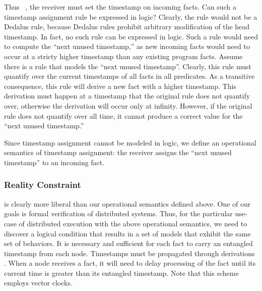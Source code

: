 Thus~ , the receiver must set the timestamp on incoming  facts.  Can such a timestamp assignment rule be expressed in logic?  Clearly, the rule would not be a Dedalus rule, because Dedalus rules prohibit arbitrary modification of the head timestamp.  In fact, no such rule can be expressed in logic.  Such a rule would need to compute the ``next unused timestamp,''  as new incoming facts would need to occur at a stricty higher timestamp than any existing program facts.  Assume there is a rule that models the ``next unused timestamp''.  Clearly, this rule must quantify over the current timestamps of all facts in all predicates.  As a transitive consequence, this rule will derive a new fact with a higher timestamp.  This derivation must happen at a timestamp that the original rule does not quantify over, otherwise the derivation will occur only at infinity.  However, if the original rule does not quantify over all time, it cannot produce a correct value for the ``next unused timestamp.'' 

Since timestamp assignment cannot be modeled in logic, we define an operational semantics of timestamp assignment:   the receiver assigns the ``next unused timestamp'' to an incoming fact.~

\subsubsection{Reality Constraint}

 is clearly more liberal than our operational semantics defined above.  One of our goals is formal verification of distributed systems.  Thus, for the particular use-case of distributed execution with the above operational semantics, we need to discover a logical condition that results in a set of models that exhibit the same set of behaviors.  It is  necessary and sufficient for each fact to carry an entangled timestamp from each node.  Timestamps must be propagated through derivations .  When a node receives a fact, it will need to delay processing of the fact until its current time is greater than its entangled timestamp.  Note that this scheme employs vector clocks.

